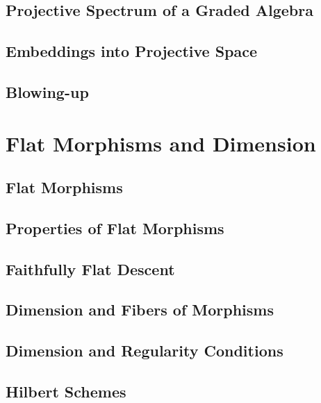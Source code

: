 \documentclass[11pt, a4paper]{article}
\begin{document}
\subsection{Projective Spectrum of a Graded Algebra}

\subsection{Embeddings into Projective Space}

\subsection{Blowing-up}

\section{Flat Morphisms and Dimension}

\subsection{Flat Morphisms}

\subsection{Properties of Flat Morphisms}

\subsection{Faithfully Flat Descent}

\subsection{Dimension and Fibers of Morphisms}

\subsection{Dimension and Regularity Conditions}

\subsection{Hilbert Schemes}

\end{document}
